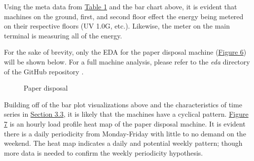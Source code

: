 Using the meta data from \hyperlink{table.1}{Table 1} and the bar chart above, it is evident that machines on the ground, first, and second floor effect the energy being metered on their respective floors (UV 1.0G, etc.). Likewise, the meter on the main terminal is measuring all of the energy. 

For the sake of brevity, only the EDA for the paper disposal machine (\hyperlink{figure.6}{Figure 6}) will be shown below. For a full machine analysis, please refer to the \textit{eda} directory of the GitHub repository \cite{GitHub}. 

\begin{figure}[h]
  \centering
  \graphicspath{ {./images/} }
  \hfill
  \caption{Paper disposal}
\end{figure}

Building off of the bar plot visualizations above and the characteristics of time series in \hyperlink{section3.3}{Section 3.3}, it is likely that the machines have a cyclical pattern. \hyperlink{figure.7}{Figure 7} is an hourly load profile heat map of the paper disposal machine. It is evident there is a daily periodicity from Monday-Friday with little to no demand on the weekend. The heat map indicates a daily and potential weekly pattern; though more data is needed to confirm the weekly periodicity hypothesis. 

